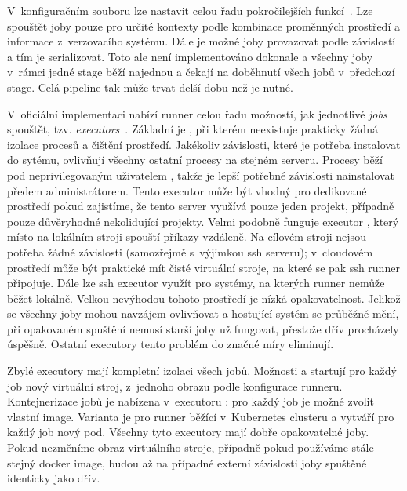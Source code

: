         \newpage
        V~konfiguračním souboru lze nastavit celou řadu pokročilejších funkcí~\cite{gitlab-runner-yaml}. Lze spouštět joby pouze pro určité kontexty podle kombinace proměnných prostředí a informace z~verzovacího systému. Dále je možné joby provazovat podle závislostí a tím je serializovat. Toto ale není implementováno dokonale a všechny joby v~rámci jedné stage běží najednou a čekají na doběhnutí všech jobů v~předchozí stage. Celá pipeline tak může trvat delší dobu než je nutné.

        \label{gitlab-executor}
        V~oficiální implementaci nabízí runner celou řadu možností, jak jednotlivé \textit{jobs} spouštět, tzv. \textit{executors}~\cite{gitlab-runner-config}. Základní je , při kterém neexistuje prakticky žádná izolace procesů a čištění prostředí. Jakékoliv závislosti, které je potřeba instalovat do sytému, ovlivňují všechny ostatní procesy na stejném serveru. Procesy běží pod neprivilegovaným uživatelem , takže je lepší potřebné závislosti nainstalovat předem administrátorem. Tento executor může být vhodný pro dedikované prostředí pokud zajistíme, že tento server využívá pouze jeden projekt, případně pouze důvěryhodné nekolidující projekty. Velmi podobně funguje executor , který místo na lokálním stroji spouští příkazy vzdáleně. Na cílovém stroji nejsou potřeba žádné závislosti (samozřejmě s~výjimkou ssh serveru); v~cloudovém prostředí může být praktické mít čisté virtuální stroje, na které se pak ssh runner připojuje. Dále lze ssh executor využít pro systémy, na kterých runner nemůže běžet lokálně. Velkou nevýhodou tohoto prostředí je nízká opakovatelnost. Jelikož se všechny joby mohou navzájem ovlivňovat a hostující systém se průběžně mění, při opakovaném spuštění nemusí starší joby už fungovat, přestože dřív procházely úspěšně. Ostatní executory tento problém do značné míry eliminují.

        Zbylé executory mají kompletní izolaci všech jobů. Možnosti  a  startují pro každý job nový virtuální stroj, z~jednoho obrazu podle konfigurace runneru. Kontejnerizace jobů je nabízena v~executoru : pro každý job je možné zvolit vlastní image. Varianta  je pro runner běžící v~Kubernetes clusteru a vytváří pro každý job nový pod. Všechny tyto executory mají dobře opakovatelné joby. Pokud nezměníme obraz virtuálního stroje, případně pokud používáme stále stejný docker image, budou až na případné externí závislosti joby spuštěné identicky jako dřív.

